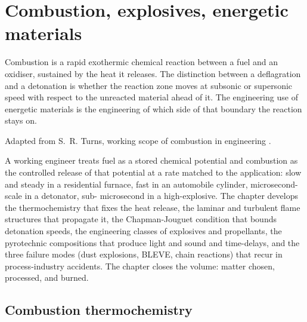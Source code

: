 \chapter{Combustion, explosives, energetic materials}
\label{vol05:ch12}

\epigraph{Combustion is a rapid exothermic chemical reaction between
a fuel and an oxidiser, sustained by the heat it releases. The
distinction between a deflagration and a detonation is whether the
reaction zone moves at subsonic or supersonic speed with respect to
the unreacted material ahead of it. The engineering use of energetic
materials is the engineering of which side of that boundary the
reaction stays on.}{Adapted from S.\ R. Turns, working scope of
combustion in engineering \cite[ch.~1, pp.~1--8]{text:turns-combustion}.}


\noindent
A working engineer treats fuel as a stored chemical potential and
combustion as the controlled release of that potential at a rate
matched to the application: slow and steady in a residential furnace,
fast in an automobile cylinder, microsecond-scale in a detonator, sub-
microsecond in a high-explosive. The chapter develops the thermochemistry
that fixes the heat release, the laminar and turbulent flame structures
that propagate it, the Chapman-Jouguet condition that bounds detonation
speeds, the engineering classes of explosives and propellants, the
pyrotechnic compositions that produce light and sound and time-delays,
and the three failure modes (dust explosions, BLEVE, chain reactions)
that recur in process-industry accidents. The chapter closes the
volume: matter chosen, processed, and burned.

\section{Combustion thermochemistry}

